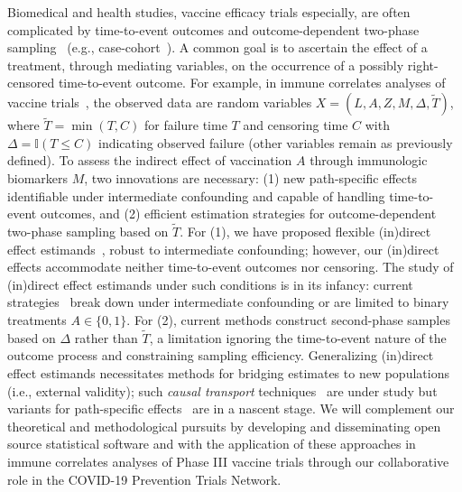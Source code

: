 Biomedical and health studies, vaccine efficacy trials especially, are often
complicated by time-to-event outcomes and outcome-dependent two-phase
sampling~\citep{follmann2006augmented} (e.g.,
case-cohort~\citep{prentice1986case, barlow1999analysis, mcelrath2008hiv}).
A common goal is to ascertain the effect of a treatment, through mediating
variables, on the occurrence of a possibly right-censored time-to-event outcome.
For example, in immune correlates analyses of vaccine
trials~\citep{haynes2012immune}, the observed data are random variables $X =
(L, A, Z, M, \Delta, \widetilde{T})$, where $\widetilde{T} = \min(T, C)$ for
failure time $T$ and censoring time $C$ with $\Delta = \mathbb{I}(T \leq C)$
indicating observed failure (other variables remain as previously defined). To
assess the indirect effect of vaccination $A$ through immunologic biomarkers
$M$, two innovations are necessary: (1) new path-specific effects identifiable
under intermediate confounding and capable of handling time-to-event outcomes,
and (2) efficient estimation strategies for outcome-dependent two-phase sampling
based on $\widetilde{T}$. For (1), we have proposed flexible (in)direct effect
estimands~\citep{diaz2020causal, hejazi2020nonparametric}, robust to
intermediate confounding; however, our (in)direct effects accommodate neither
time-to-event outcomes nor censoring. The study of (in)direct effect estimands
under such conditions is in its infancy: current
strategies~\citep[e.g.,][]{tchetgen2011causal, zheng2017longitudinal} break down
under intermediate confounding or are limited to binary treatments $A \in \{0,
1\}$. For (2), current methods construct second-phase samples based on $\Delta$
rather than $\widetilde{T}$, a limitation ignoring the time-to-event nature of
the outcome process and constraining sampling efficiency. Generalizing
(in)direct effect estimands necessitates methods for bridging estimates to new
populations (i.e., external validity); such \textit{causal transport}
techniques~\citep{pearl2011transportability, pearl2014external,
bareinboim2016causal} are under study but variants for
path-specific effects~\citep[e.g.,][]{rudolph2020efficiently}
are in a nascent stage. We will complement our theoretical and methodological
pursuits by developing and disseminating open source statistical software and
with the application of these approaches in immune correlates analyses of Phase
III vaccine trials through our collaborative role in the COVID-19 Prevention
Trials Network.


